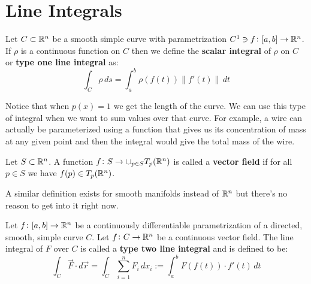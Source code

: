 \documentclass[11pt,a4paper]{article}
\begin{document}
	
	\newpage
	
	\section{Line Integrals}
	
	\begin{definition}
		Let $C \subset \mathbb{R}^n$ be a smooth simple curve with 
		parametrization $C^1 \ni f \colon [a,b] \to \mathbb{R}^n$. If $\rho$ is
		a continuous function on $C$ then we define the 
		\textbf{scalar integral} of $\rho$ on $C$ or \textbf{type one
		line integral} as:
		\[
			\int_{C}{\rho \,ds} = \int_{a}^{b}{\rho(f(t))\|f'(t)\|\,dt}
		\]
	\end{definition}
	Notice that when $p(x) = 1$ we get the length of the curve. We can
	use this type of integral when we want to sum values over that
	curve. For example, a wire can actually be parameterized using
	a function that gives us its concentration of mass at any given
	point and then the integral would give the total mass of the wire.
	\begin{definition}
		Let $S \subset \mathbb{R}^n$. A function 
		$f \colon S \to \cup_{p \in S}{T_p(\mathbb{R}^n)}$ is called a
		\textbf{vector field} if for all $p \in S$ we have
		$f(p) \in T_p(\mathbb{R}^n)$.
	\end{definition}
	A similar definition exists for smooth manifolds instead of $\mathbb{R}^n$ 
	but there's no reason to get into it right now.
	\begin{definition}
		Let $f \colon [a,b] \to \mathbb{R}^n$ be a continuously differentiable
		parametrization of a directed, smooth, simple curve $C$.
		Let $f \colon C \to \mathbb{R}^n$ be a continuous vector field. The
		line integral of $F$ over $C$ is called a \textbf{type two
		line integral} and is defined to be:
		\[
			\int_{C}{\vec{F} \cdot d\vec{r}} = 
			\int_{C}{\sum_{i=1}^{n}{F_i}\,dx_i} :=
			\int_{a}^{b}{F(f(t)) \cdot f'(t) \,dt}
		\]
	\end{definition}
	
	\newpage
	
\end{document}
